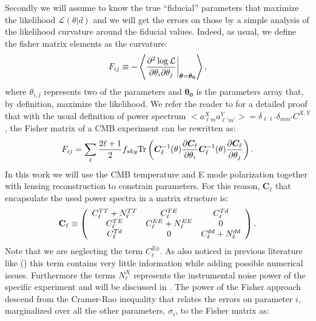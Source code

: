 \documentclass[aps,prd,preprint,groupedaddress]{revtex4-1}
\begin{document}
 
Secondly we will assume to know the true ``fiducial'' parameters that maximize the likelihood $\mathcal{L}(\theta|d)$ and we will get the errors on those by a simple analysis of the likelihood curvature around the fiducial values.
Indeed, as usual, we define the fisher matrix elements as the curvature:
\begin{equation}
	\centering
		F_{ij} \equiv - \left\langle\frac{\partial^2 \log \mathcal{L}}{\partial \theta_i \partial \theta_j} \bigg|_{\boldsymbol{\theta} = \boldsymbol{\theta_0}}\right\rangle,
	\label{eqn:Fij_def}
\end{equation}
where $\theta_{i,j}$ represents two of the parameters and $\boldsymbol{\theta_0}$ is the parameters array that, by definition, maximize the likelihood.
We refer the reader to \cite{} for a detailed proof that with the usual definition of power spectrum $<a_{\ell m}^{X}a_{\ell' m'}^{Y}>=\delta_{\ell \ell'}\delta_{mm'}C^{X,Y}$, the Fisher matrix of a CMB experiment can be rewritten as:
\begin{equation}
 F_{ij} = \sum_\ell \frac{2\ell+1}{2} f_{sky} {\rm Tr} \left(  \boldsymbol{C}^{-1}_\ell( \theta) \frac{\partial \boldsymbol{C}_\ell}{\partial \theta_i} \boldsymbol{C}^{-1}_\ell( \theta) \frac{\partial \boldsymbol{C}_\ell}{\partial \theta_j}  \right).
 \label{eqn:Fij_def2}
 \end{equation}
 In this work we will use the CMB temperature and E mode polarization together with lensing reconstruction to constrain parameters. For this reason, $\boldsymbol{C}_\ell$ that encapsulate the used power spectra in a matrix structure is:
 \begin{eqnarray}
 	\centering
		\mathbf{C}_\ell \equiv \left( \begin{array}{ccc}C_\ell^{TT} + N_\ell^{TT} & C_\ell^{TE} & C_\ell^{Td} \\ C_\ell^{TE} & C_\ell^{EE} + N_\ell^{EE} & 0 \\ C_\ell^{Td} & 0 & C_\ell^{dd} + N_\ell^{dd}\end{array}\right).
	\label{eqn:cov_definition}
\end{eqnarray}
Note that we are neglecting the term $C_\ell^{E\phi}$. As also noticed in previous literature like (\cite{wu:2014,2013PhRvD..87h3008H}) this term contains very little information while adding possible numerical issues.
Furthermore the terms $N_\ell^{X}$ represents the instrumental noise power of the specific experiment and will be discussed in .
The power of the Fisher approach descend from the Cramer-Rao inequality that relates the errors on parameter $i$, marginalized over all the other parameters, $\sigma_i$, to the Fisher matrix as:
\end{document}
